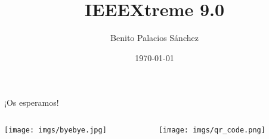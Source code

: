 \documentclass[usenames,dvipsnames]{beamer}
\title{IEEEXtreme 9.0}
\date[Septiembre de 2015]{\today}
\author{Benito Palacios Sánchez}
\institute[IEEE SB UGR]{Rama estudiantil de IEEE en la UGR}
\begin{document}
	\begin{frame}[plain]
    		\titlepage
	\end{frame}

	
	
	
	\section{}
	\begin{frame}
		\begin{center}
			\huge ¡Os esperamos!
		\end{center}
		
		\begin{columns}
		\begin{column}{0.60\textwidth}
			\texttt{[image: imgs/byebye.jpg]}
		\end{column}
		
		\begin{column}{0.40\textwidth}

			\texttt{[image: imgs/qr\_code.png]}
		\end{column}
		\end{columns}
	\end{frame}
\end{document}
